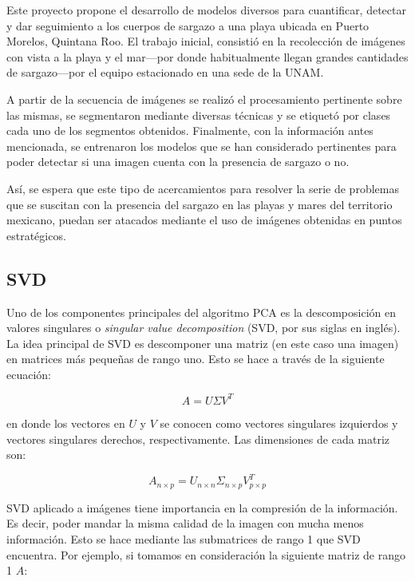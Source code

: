 \documentclass[conference]{IEEEtran}
\begin{document}
Este proyecto propone el desarrollo de modelos diversos para cuantificar, detectar y dar seguimiento a los cuerpos de sargazo a una playa ubicada en Puerto Morelos, Quintana Roo. El trabajo inicial, consistió en la recolección de imágenes con vista a la playa y el mar---por donde habitualmente llegan grandes cantidades de sargazo---por el equipo estacionado en una sede de la UNAM.

A partir de la secuencia de imágenes se realizó el procesamiento pertinente sobre las mismas, se segmentaron mediante diversas técnicas y se etiquetó por clases cada uno de los segmentos obtenidos. Finalmente, con la información antes mencionada, se entrenaron los modelos que se han considerado pertinentes para poder detectar si una imagen cuenta con la presencia de sargazo o no.

Así, se espera que este tipo de acercamientos para resolver la serie de problemas que se suscitan con la presencia del sargazo en las playas y mares del territorio mexicano, puedan ser atacados mediante el uso de imágenes obtenidas en puntos estratégicos.

\subsection{SVD}
Uno de los componentes principales del algoritmo PCA es la descomposición en valores singulares o \textit{singular value decomposition} (SVD, por sus siglas en inglés). La idea principal de SVD es descomponer una matriz (en este caso una imagen) en matrices más pequeñas de rango uno. Esto se hace a través de la siguiente ecuación: 

\begin{equation} \label{eq:svd}
    A = U\Sigma V^T
\end{equation}

en donde los vectores en $U$ y $V$ se conocen como vectores singulares izquierdos y vectores singulares derechos, respectivamente. Las dimensiones de cada matriz son: 

\begin{equation}\label{eq:svd_dimensions}
    A_{n\times p} = U_{n\times n} \Sigma_{n\times p} V_{p\times p}^T
\end{equation}

SVD aplicado a imágenes tiene importancia en la compresión de la información. Es decir, poder mandar la misma calidad de la imagen con mucha menos información. Esto se hace mediante las submatrices de rango 1 que SVD encuentra. Por ejemplo, si tomamos en consideración la siguiente matriz de rango 1 $A$:
\end{document}
